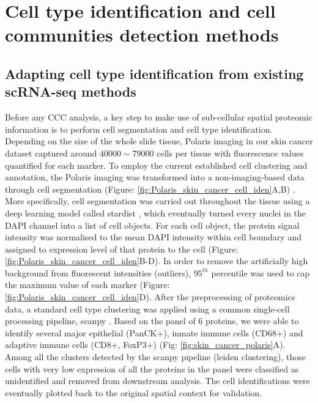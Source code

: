 \section{Cell type identification and cell communities detection methods}
\label{Sec:3.2_CCC_ST}	%
\subsection{Adapting cell type identification from existing scRNA-seq methods}
Before any CCC analysis, a key step  to make use of sub-cellular spatial proteomic information is to perform cell segmentation and cell type identification. Depending on the size of the whole slide tissue, Polaris imaging in our skin cancer dataset captured around $40000\sim 79000$ cells per tissue with fluorescence values quantified for each marker. To employ the current established cell clustering and annotation, the Polaris imaging was transformed into a non-imaging-based data through cell segmentation (Figure: \ref{fig:Polaris_skin_cancer_cell_iden}A,B) \cite{hickey2021strategies}. More specifically, cell segmentation was carried out throughout the tissue using a deep learning model called stardist \cite{schmidt2018cell}, which eventually turned every nuclei in the DAPI channel into a list of cell objects. For each cell object, the protein signal intensity was normalised to the mean DAPI intensity within cell boundary and assigned to expression level of that protein to the cell (Figure: \ref{fig:Polaris_skin_cancer_cell_iden}B-D). In order to remove the artificially high background from fluorescent intensities (outliers), $95^{th}$ percentile was used to cap the maximum value of each marker (Figure: \ref{fig:Polaris_skin_cancer_cell_iden}D). After the preprocessing of proteomics data, a standard cell type clustering was applied using a common single-cell processing pipeline, scanpy \cite{wolf2018scanpy}. Based on the panel of 6 proteins, we were able to identify several major epithelial (PanCK+), inmate immune cells (CD68+) and adaptive immune cells (CD8+, FoxP3+) (Fig: \ref{fig:skin_cancer_polaris}A). Among all the clusters detected by the scanpy pipeline (leiden clustering), those cells with very low expression of all the proteins in the panel were classified as unidentified and removed from downstream analysis. The cell identifications were eventually plotted back to the original spatial context for validation.  

